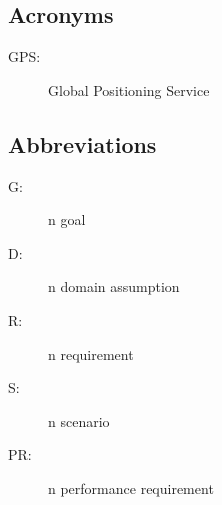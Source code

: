\documentclass[../../rasd.tex]{subfiles}
\begin{document}
		\subsection{Acronyms}
		\begin{description}
		\item[GPS:]Global Positioning Service
		\end{description}
		\subsection{Abbreviations}
		\begin{description}
			\item[G:]n goal
			\item[D:]n domain assumption
			\item[R:]n requirement
			\item[S:]n scenario
			\item[PR:]n performance requirement
			
		\end{description}
		
\end{document}
